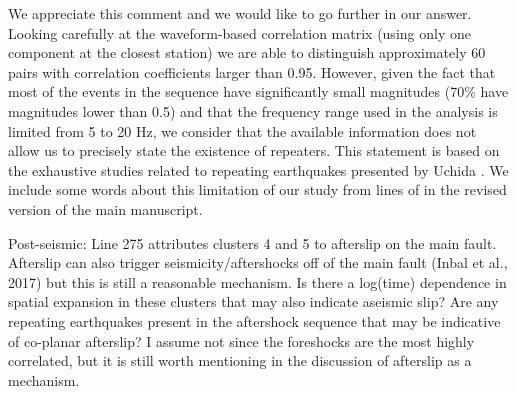\documentclass[10pt]{extarticle}
\begin{document}
\begin{Answer}
We appreciate this comment and we would like to go further in our answer. Looking carefully at the waveform-based correlation matrix (using only one component at the closest station) we are able to distinguish approximately 60 pairs with correlation coefficients larger than 0.95. However, given the fact that most of the events in the sequence have significantly small magnitudes (70\% have magnitudes lower than 0.5) and that the frequency range used in the analysis is limited from 5 to 20 Hz, we consider that the available information does not allow us to precisely state the existence of repeaters. This statement is based on the exhaustive studies related to repeating earthquakes presented by Uchida \citep{uchida2019,uchida2019repeating}. We include some words about this limitation of our study from lines    of in the revised version of the main manuscript. 
 \WorkInProgressRevTask
\end{Answer}
%
%



\begin{ReviewerComment}{2}
\noindent 
Post-seismic: Line 275 attributes clusters 4 and 5 to afterslip on the main fault. Afterslip can also trigger seismicity/aftershocks off of the main fault (Inbal et al., 2017) but this is still a reasonable mechanism. Is there a log(time) dependence in spatial expansion in these clusters that may also indicate aseismic slip? Are any repeating earthquakes present in the aftershock sequence that may be indicative of co-planar afterslip? I assume not since the foreshocks are the most highly correlated, but it is still worth mentioning in the discussion of afterslip as a mechanism.
\end{ReviewerComment}
\end{document}
